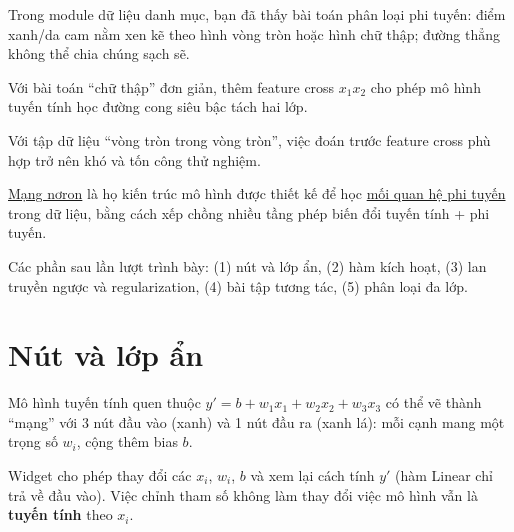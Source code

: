 \documentclass[12pt,a4paper]{article}
\begin{document}
\begin{dongco}[title={Bài toán phi tuyến}]
Trong module dữ liệu danh mục, bạn đã thấy bài toán phân loại phi tuyến: điểm xanh/da cam nằm xen kẽ theo hình vòng tròn hoặc hình chữ thập; đường thẳng không thể chia chúng sạch sẽ.
\end{dongco}

\begin{vidu}[title={Feature cross cho bài toán đơn giản}]
Với bài toán ``chữ thập'' đơn giản, thêm feature cross $x_1x_2$ cho phép mô hình tuyến tính học đường cong siêu bậc tách hai lớp.
\end{vidu}

\begin{vidu}[title={Bài toán vòng tròn khó hơn}]
Với tập dữ liệu ``vòng tròn trong vòng tròn'', việc đoán trước feature cross phù hợp trở nên khó và tốn công thử nghiệm.
\end{vidu}

\begin{dinhnghia}[title={Mạng nơron}]
\href{https://developers.google.com/machine-learning/glossary\#neural_network}{Mạng nơron} là họ kiến trúc mô hình được thiết kế để học \href{https://developers.google.com/machine-learning/glossary\#nonlinear}{mối quan hệ phi tuyến} trong dữ liệu, bằng cách xếp chồng nhiều tầng phép biến đổi tuyến tính + phi tuyến.
\end{dinhnghia}

\begin{tongket}
Các phần sau lần lượt trình bày: (1) nút và lớp ẩn, (2) hàm kích hoạt, (3) lan truyền ngược và regularization, (4) bài tập tương tác, (5) phân loại đa lớp.
\end{tongket}

\section{Nút và lớp ẩn}

\begin{dinhnghia}[title={Mô hình tuyến tính dạng mạng}]
Mô hình tuyến tính quen thuộc $y' = b + w_1x_1 + w_2x_2 + w_3x_3$ có thể vẽ thành ``mạng'' với 3 nút đầu vào (xanh) và 1 nút đầu ra (xanh lá): mỗi cạnh mang một trọng số $w_i$, cộng thêm bias $b$.
\end{dinhnghia}

\begin{phuongphap}[title={Bài tập 1 (tương tác trong MLCC)}]
Widget cho phép thay đổi các $x_i$, $w_i$, $b$ và xem lại cách tính $y'$ (hàm Linear chỉ trả về đầu vào). Việc chỉnh tham số không làm thay đổi việc mô hình vẫn là \textbf{tuyến tính} theo $x_i$.
\end{phuongphap}
\end{document}
